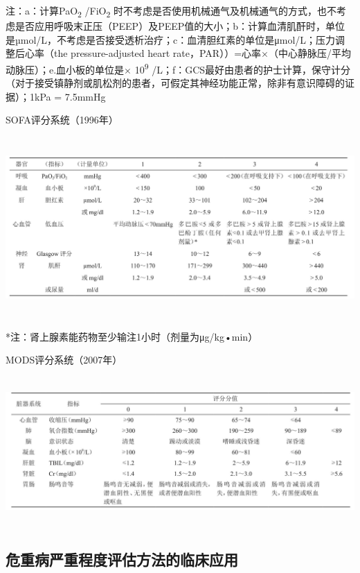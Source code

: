 注：a：计算PaO\textsubscript{2} /FiO\textsubscript{2}
时不考虑是否使用机械通气及机械通气的方式，也不考虑是否应用呼吸末正压（PEEP）及PEEP值的大小；b：计算血清肌酐时，单位是µmol/L，不考虑是否接受透析治疗；c：血清胆红素的单位是μmol/L；压力调整后心率（the
pressure-adjusted heart
rate，PAR））=心率×（中心静脉压/平均动脉压）；e.血小板的单位是×
10\textsuperscript{9}
/L；f：GCS最好由患者的护士计算，保守计分（对于接受镇静剂或肌松剂的患者，可假定其神经功能正常，除非有意识障碍的证据）；1kPa
= 7.5mmHg

\begin{table}[htbp]
\centering
\caption{SOFA评分系统（1996年）}
\label{tab147-11}
\includegraphics[width=6.66667in,height=2.70833in]{./images/Image00548.jpg}
\end{table}

*注：肾上腺素能药物至少输注1小时（剂量为μg/kg•min）

\begin{table}[htbp]
\centering
\caption{MODS评分系统（2007年）}
\label{tab147-12}
\includegraphics[width=6.64583in,height=2.23958in]{./images/Image00549.jpg}
\end{table}

\subsection{危重病严重程度评估方法的临床应用}


